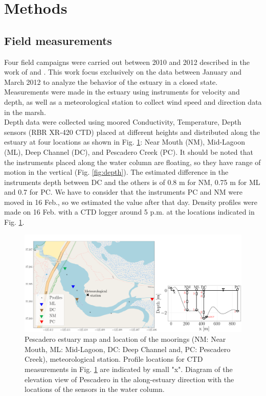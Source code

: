 \documentclass[tesis.tex]{subfiles}
\begin{document}
    
\section{Methods}

\subsection{Field measurements}

Four field campaigns were carried out between 2010 and 2012 described in the work of \cite{Williams2014} and \cite{williams2016}. This work focus exclusively on the data between January and March 2012 to analyze the behavior of the estuary in a closed state. Measurements were made in the estuary using instruments for velocity and depth, as well as a meteorological station to collect wind speed and direction data in the marsh. \\

Depth data were collected using moored Conductivity, Temperature, Depth sensors (RBR XR-420 CTD) placed at different heights and distributed along the estuary at four locations as shown in Fig. \ref{fig:mapPDO}: Near Mouth (NM), Mid-Lagoon (ML), Deep Channel (DC), and Pescadero Creek (PC). It should be noted that the instruments placed along the water column are floating, so they have range of motion in the vertical (Fig. \ref{fig:depth}). The estimated difference in the instruments depth between DC and the others is of 0.8 m for NM, 0.75 m for ML and 0.7 for PC. We have to consider that the instruments PC and NM were moved in 16 Feb., so we estimated the value after that day. Density profiles were made on 16 Feb. with a CTD logger around 5 p.m. at the locations indicated in Fig. \ref{fig:mapPDO}.\\

\begin{figure}[h!]
    \centering
    \includegraphics[width=\textwidth]{Imagenes/mapa3.png}
    \caption{Pescadero estuary map and location of the moorings (NM: Near Mouth, ML: Mid-Lagoon, DC: Deep Channel and, PC: Pescadero Creek), meteorological station. Profile locations for CTD measurements in Fig. \ref{fig:mapPDO} are indicated by small "x". Diagram of the elevation view of Pescadero in the along-estuary direction with the locations of the sensors in the water column.}
    \label{fig:mapPDO}
\end{figure}
\end{document}
